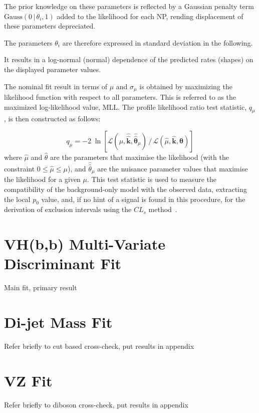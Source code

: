 The prior knowledge on these parameters is reflected by a Gaussian penalty term
$\text{Gauss}(0\,|\,\theta_i,1)$ added to the likelihood for each NP, rending
displacement of these parameters depreciated.

The parameters $\theta_i$ are therefore expressed in standard deviation in the
following.

It results in a log-normal (normal) dependence of the predicted rates (shapes)
on the displayed parameter values.


The nominal fit result in terms of $\mu$ and $\sigma_{\mu}$ is obtained by
maximizing the likelihood function with respect to all parameters.  This is
referred to as the maximized log-likelihood value, MLL. The profile likelihood
ratio test statistic, $q_\mu$, is then constructed as follows:

\begin{equation}
  q_\mu = - 2\; \ln \left[ \mathcal{L} (\mu, \hat{\hat{\mathbf{k}}}, \hat{\hat{\bm\theta}}_{\mu})\, / \, \mathcal{L} (\hat{\mu}, \hat{\mathbf{k}}, \hat{\bm\theta}) \right]
\end{equation}
where $\hat{\mu}$ and $\hat{\theta}$ are the parameters that maximise the
likelihood (with the constraint $0 \leq \hat{\mu} \leq \mu$), and
$\hat{\hat{\theta}}_\mu$ are the nuisance parameter values that maximise the
likelihood for a given $\mu$. This test statistic is used to measure the
compatibility of the background-only model with the observed data, extracting
the local $p_0$ value, and, if no hint of a signal is found in this procedure,
for the derivation of exclusion intervals using the $CL_s$
method~\cite{Cowan:2010js,Read:2002hq}.


\section{VH(b,b) Multi-Variate Discriminant Fit}%
\label{sec:mva-fit}
Main fit, primary result

\section{Di-jet Mass Fit}%
\label{sec:mbb-fit}
Refer briefly to cut based cross-check, put results in appendix
\section{VZ Fit}%
\label{sec:mvadiboson-fit}
Refer briefly to diboson cross-check, put results in appendix
